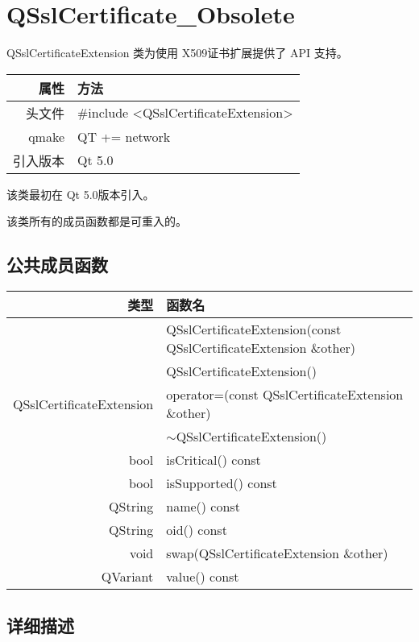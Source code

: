 \chapter{QSslCertificate\_Obsolete}

QSslCertificateExtension 类为使用 X509证书扩展提供了 API 支持。

\begin{tabular}{|r|l|}
	\hline
	属性 & 方法 \\
	\hline
	头文件 & \#include <QSslCertificateExtension>\\      
	\hline
	qmake & QT += network\\      
	\hline
	引入版本 &	Qt 5.0 \\ 
	\hline
\end{tabular}

该类最初在 Qt 5.0版本引入。

\begin{notice}
该类所有的成员函数都是可重入的。
\end{notice}

\section{公共成员函数}

\begin{tabular}{|r|m{20em}|}
\hline 
类型 	& 函数名 \\ 
\hline
&QSslCertificateExtension(const QSslCertificateExtension \&other) \\
\hline
&QSslCertificateExtension()\\
\hline
QSslCertificateExtension & 	operator=(const QSslCertificateExtension \&other) \\
\hline
&$\sim$QSslCertificateExtension() \\ 
\hline
bool 	&isCritical() const \\ 
\hline
bool 	&isSupported() const \\ 
\hline
QString &	name() const \\ 
\hline
QString &	oid() const \\ 
\hline
void 	&swap(QSslCertificateExtension \&other) \\ 
\hline
QVariant 	&value() const \\ 
\hline
\end{tabular}

\section{详细描述}


